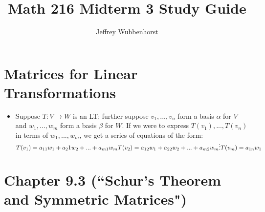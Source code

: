 \documentclass[10pt,letterpaper]{article}
\author{Jeffrey Wubbenhorst}
\title{Math 216 Midterm 3 Study Guide }
\begin{document}
\maketitle

\section{Matrices for Linear Transformations}
\begin{itemize} 
\item Suppose $T: V\to W$ is an LT; further suppose $v_1, ...,v_n$ form a basis $\alpha$ for $V$ and $w_1, ..., w_m$ form a basis $\beta$ for $W$. If we were to express $T(v_1),...,T(v_n)$ in terms of 
$w_1,...,w_m$, we get a series of equations of the form: 
$
T(v_1) =a_{11}w_1+a_21w_2+...+a_{m1}w_{m} \\
T(v_2) = a_{12}w_1+a_{22}w_2+...+a_{m2}w_m \\
\vdots \\
T(v_m)=a_{1n}w_1
$

\end{itemize}

\section*{Chapter 9.3 (``Schur's Theorem and Symmetric Matrices")}
\end{document}
